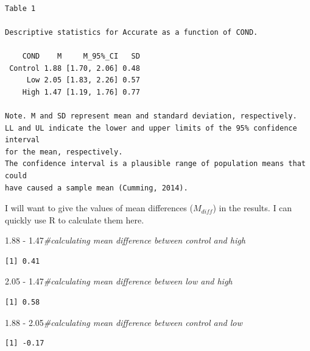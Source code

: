 \documentclass[
  english,
]{book}
\newenvironment{Shaded}{\begin{snugshade}}{\end{snugshade}}
\newcommand{\CommentTok}[1]{\textcolor[rgb]{0.56,0.35,0.01}{\textit{#1}}}
\newcommand{\FloatTok}[1]{\textcolor[rgb]{0.00,0.00,0.81}{#1}}
\newcommand{\SpecialCharTok}[1]{\textcolor[rgb]{0.00,0.00,0.00}{#1}}
\begin{document}
\begin{verbatim}

Table 1 

Descriptive statistics for Accurate as a function of COND.  

    COND    M     M_95%_CI   SD
 Control 1.88 [1.70, 2.06] 0.48
     Low 2.05 [1.83, 2.26] 0.57
    High 1.47 [1.19, 1.76] 0.77

Note. M and SD represent mean and standard deviation, respectively.
LL and UL indicate the lower and upper limits of the 95% confidence interval 
for the mean, respectively. 
The confidence interval is a plausible range of population means that could 
have caused a sample mean (Cumming, 2014). 
\end{verbatim}

I will want to give the values of mean differences (\(M_{diff}\)) in the results. I can quickly use R to calculate them here.

\begin{Shaded}
\begin{Highlighting}[]
\FloatTok{1.88} \SpecialCharTok{{-}} \FloatTok{1.47}\CommentTok{\#calculating mean difference between control and high}
\end{Highlighting}
\end{Shaded}

\begin{verbatim}
[1] 0.41
\end{verbatim}

\begin{Shaded}
\begin{Highlighting}[]
\FloatTok{2.05} \SpecialCharTok{{-}} \FloatTok{1.47}\CommentTok{\#calculating mean difference between low and high}
\end{Highlighting}
\end{Shaded}

\begin{verbatim}
[1] 0.58
\end{verbatim}

\begin{Shaded}
\begin{Highlighting}[]
\FloatTok{1.88} \SpecialCharTok{{-}} \FloatTok{2.05}\CommentTok{\#calculating mean difference between  control and low}
\end{Highlighting}
\end{Shaded}

\begin{verbatim}
[1] -0.17
\end{verbatim}
\end{document}
